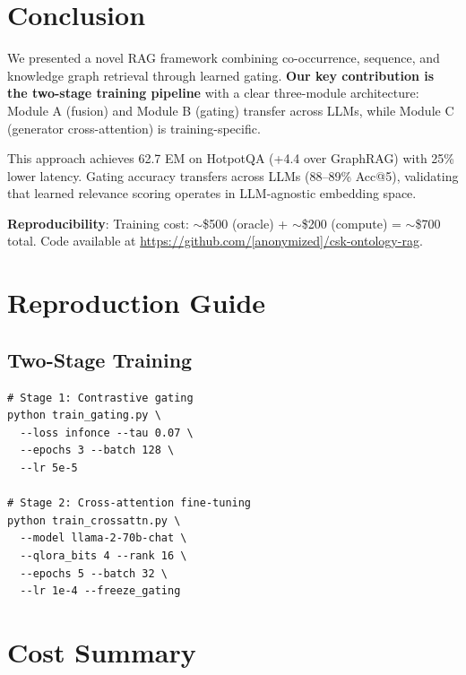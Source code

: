 \documentclass[10pt,twocolumn]{article}
\begin{document}
\section{Conclusion}

We presented a novel RAG framework combining co-occurrence, sequence, and knowledge graph retrieval through learned gating. \textbf{Our key contribution is the two-stage training pipeline} with a clear three-module architecture: Module A (fusion) and Module B (gating) transfer across LLMs, while Module C (generator cross-attention) is training-specific. 

This approach achieves 62.7 EM on HotpotQA (+4.4 over GraphRAG) with 25\% lower latency. Gating accuracy transfers across LLMs (88--89\% Acc@5), validating that learned relevance scoring operates in LLM-agnostic embedding space.

\textbf{Reproducibility}: Training cost: $\sim$\$500 (oracle) + $\sim$\$200 (compute) = $\sim$\$700 total. Code available at \url{https://github.com/[anonymized]/csk-ontology-rag}.




\appendix

\section{Reproduction Guide}
\label{app:repro}

\subsection{Two-Stage Training}
\begin{verbatim}
# Stage 1: Contrastive gating
python train_gating.py \
  --loss infonce --tau 0.07 \
  --epochs 3 --batch 128 \
  --lr 5e-5

# Stage 2: Cross-attention fine-tuning
python train_crossattn.py \
  --model llama-2-70b-chat \
  --qlora_bits 4 --rank 16 \
  --epochs 5 --batch 32 \
  --lr 1e-4 --freeze_gating
\end{verbatim}

\section{Cost Summary}
\label{app:cost}
\end{document}
